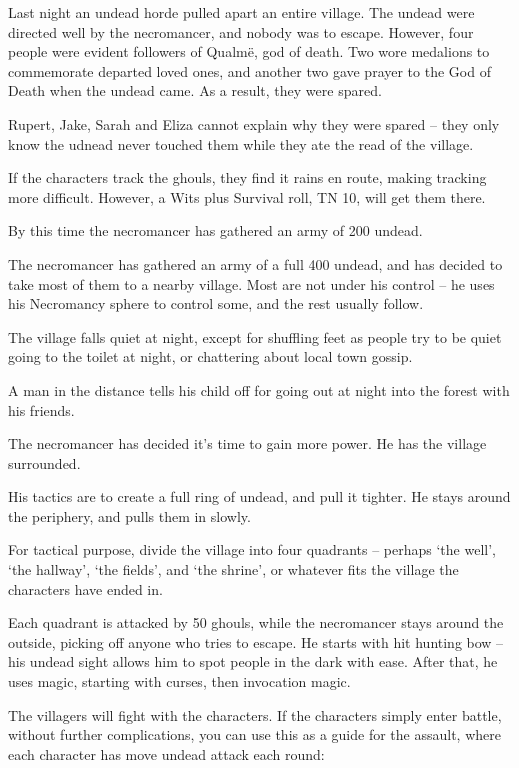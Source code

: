 \begin{multicols}{2}
Last night an undead horde pulled apart an entire village.  The undead were directed well by the necromancer, and nobody was to escape.  However, four people were evident followers of Qualm\"{e}, god of death.  Two wore medalions to commemorate departed loved ones, and another two gave prayer to the God of Death when the undead came.  As a result, they were spared.

Rupert, Jake, Sarah and Eliza cannot explain why they were spared -- they only know the udnead never touched them while they ate the read of the village.

If the characters track the ghouls, they find it rains en route, making tracking more difficult.  However, a Wits plus Survival roll, TN 10, will get them there.

By this time the necromancer has gathered an army of 200 undead.


The necromancer has gathered an army of a full 400 undead, and has decided to take most of them to a nearby village.  Most are not under his control -- he uses his Necromancy sphere to control some, and the rest usually follow.

\begin{boxtext}
	The village falls quiet at night, except for shuffling feet as people try to be quiet going to the toilet at night, or chattering about local town gossip.

	A man in the distance tells his child off for going out at night into the forest with his friends.
\end{boxtext}

The necromancer has decided it's time to gain more power.  He has the village surrounded.

His tactics are to create a full ring of undead, and pull it tighter.  He stays around the periphery, and pulls them in slowly.

For tactical purpose, divide the village into four quadrants -- perhaps `the well', `the hallway', `the fields', and `the shrine', or whatever fits the village the characters have ended in.

Each quadrant is attacked by 50 ghouls, while the necromancer stays around the outside, picking off anyone who tries to escape.  He starts with hit hunting bow -- his undead sight allows him to spot people in the dark with ease.  After that, he uses magic, starting with curses, then invocation magic.

The villagers will fight with the characters.  If the characters simply enter battle, without further complications, you can use this as a guide for the assault, where each character has move undead attack each round:


\end{multicols}
